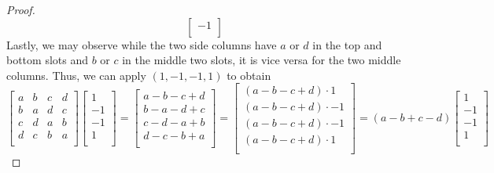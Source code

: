 \documentclass[../psets.tex]{subfiles}
\begin{document}
\begin{enumerate}
\begin{enumerate}
\begin{proof}
\begin{equation*}
\begin{bmatrix}
                    -1\\
                \end{bmatrix}
            \end{equation*}
            Lastly, we may observe while the two side columns have $a$ or $d$ in the top and bottom slots and $b$ or $c$ in the middle two slots, it is vice versa for the two middle columns. Thus, we can apply $(1,-1,-1,1)$ to obtain
            \begin{equation*}
                \begin{bmatrix}
                    a & b & c & d\\
                    b & a & d & c\\
                    c & d & a & b\\
                    d & c & b & a\\
                \end{bmatrix}
                \begin{bmatrix}
                    1\\
                    -1\\
                    -1\\
                    1\\
                \end{bmatrix}
                =
                \begin{bmatrix}
                    a-b-c+d\\
                    b-a-d+c\\
                    c-d-a+b\\
                    d-c-b+a\\
                \end{bmatrix}
                =
                \begin{bmatrix}
                    (a-b-c+d)\cdot 1\\
                    (a-b-c+d)\cdot -1\\
                    (a-b-c+d)\cdot -1\\
                    (a-b-c+d)\cdot 1\\
                \end{bmatrix}
                = (a-b+c-d)
                \begin{bmatrix}
                    1\\
                    -1\\
                    -1\\
                    1\\

\end{bmatrix}
\end{equation*}
\end{proof}
\end{enumerate}
\end{enumerate}
\end{document}
